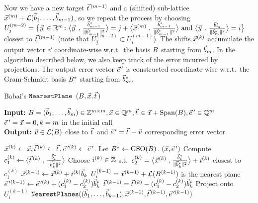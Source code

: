 Now we have a new target $\tvec^{(m-1)}$ and a (shifted) sub-lattice $\vec x^{(m)} + \mathcal{L}(\vec b_1, \ldots, \vec b_{m-1})$, so we repeat the process by choosing $U_j^{(m-2)} = \smash{ \bigl\{\yvec \in \R^m \colon \bigScProd{\yvec}{\frac{\wbvec_{m-1}}{\| \wbvec_{m-1} \|^2}} = j +  \bigScProd{\xvec^{(m)}}{\frac{\wbvec_{m-1}}{\| \wbvec_{m-1} \|^2}} \text{ and } \bigScProd{\yvec}{\frac{\wbvec_m}{\| \wbvec_m \|^2}} = i \bigr\} }$ closest to $\tvec^{(m-1)}$ (note that $U_j^{(m-2)} \subset U_i^{(m-1)}$). The shifts $\vec x^{(k)}$  accumulate the output vector $\vvec$ coordinate-wise w.r.t.\ the basis $B$ starting from $\vec b_m$. In the algorithm described below, we also keep track of the error incurred by projections. The output error vector $\evec'$ is constructed coordinate-wise w.r.t.\ the Gram-Schmidt basis $B^*$ starting from $\vec b^*_m$.
%
%
\setlength{\intextsep}{\medskipamount}
\begin{algorithm}[h]
\caption{Babai's $\texttt{NearestPlane}$ $(\BMat, \xvec, \protect \tvec)$}
\label{alg:Babai}
\textbf{Input:} $\BMat=(\bvec_1, \ldots, \bvec_m) \in \Z^{m \times m}, \xvec \in \Q^m, \tvec \in \xvec+\Span(\BMat), \evec' \in \Q^m$ \hfill \Comment \scriptsize{$\evec'=\xvec=0, k=m$ in the initial call}\\
\normalsize
\textbf{Output:} $\vvec\in \Lat(\BMat)$ close to $\tvec$ and $\evec' = \tvec-\vvec$ corresponding error vector
\begin{algorithmic}[1]
\State $\xvec^{(k)}\gets \xvec, \tvec^{(k)}\gets \tvec,\evec'^{(k)}\gets\evec'$. 
\State Let $B^* \gets \operatorname{GSO}(B)$. 
 \Return $(\xvec,\evec')$
\EndIf
\State Compute $c^{(k)}_1 \gets \bigScProd{\tvec^{(k)}}{\frac{\wbvec_k}{ \vphantom{\scalebox{1.6}x^2} \|\wbvec_k \|^2}}$
\State Choose $i^{(k)} \in {{\mathbb Z}}$ s.t.\ $c^{(k)}_2 = \bigl\langle\vec x^{(k)}\mathrel{,}\frac{\vec b^*_k}{\|\vec b^*_k \|^2}\bigr\rangle + i^{(k)}$ closest to $c^{(k)}_1$ \label{algline:BabaiChoosePlane}
\State $\vec x^{(k-1)}\gets \vec x^{(k)}+i^{(k)}\vec b_k$ \label{algline:BabaiChooseTranslate}
\Comment $U_i^{(k-1)} = \vec x^{(k-1)}+\mathcal{L}(B^{(k-1)})$ is the nearest plane
\State $\evec'^{(k-1)}\gets \evec'^{(k)} + (c^{(k)}_1-c^{(k)}_2)\wbvec_k$
\State $\tvec^{(k-1)}=\tvec^{(k)} - (c^{(k)}_1-c^{(k)}_2)\wbvec_k$ \label{algline:BabaiProjectTarget} \Comment Project onto $U_i^{(k-1)}$ 
\State \Return $\texttt{NearestPlanes} ((\bvec_1,\ldots,\bvec_{k-1}), \xvec^{(k-1)},\tvec^{(k-1)},\evec'^{(k-1)})$
\end{algorithmic} 
\end{algorithm}

